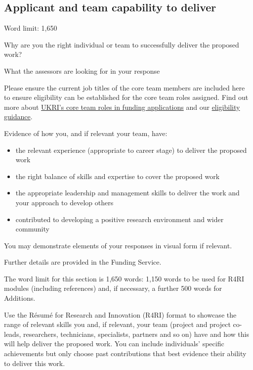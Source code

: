\documentclass[11pt]{article}
\newenvironment{instruction}{%
    \begin{tcolorbox}[breakable,colback=red!5,colframe=red,title=Instruction]%
	}{%
    	\end{tcolorbox}%
	}
\begin{document}
\pagebreak
\subsection{Applicant and team capability to deliver}

\begin{instruction}
Word limit: 1,650

Why are you the right individual or team to successfully deliver the proposed
work?

What the assessors are looking for in your response

Please ensure the current job titles of the core team members are included
here to ensure eligibility can be established for the core team roles assigned.
Find out more about
\href{https://www.ukri.org/publications/roles-in-funding-applications/roles-in-funding-applications-eligibility-responsibilities-and-costings-guidance/}{UKRI’s
core team roles in funding applications} and our
\href{https://www.ukri.org/councils/bbsrc/guidance-for-applicants/check-if-youre-eligible-for-funding/applicants-and-co-applicants/}{eligibility
guidance}.

Evidence of how you, and if relevant your team, have:

\begin{itemize}

    \item the relevant experience (appropriate to career stage) to deliver the proposed
work

    \item the right balance of skills and expertise to cover the proposed work

    \item the appropriate leadership and management skills to deliver the work and
your approach to develop others

    \item contributed to developing a positive research environment and wider
community

\end{itemize}

You may demonstrate elements of your responses in visual form if relevant.

Further details are provided in the Funding Service.

The word limit for this section is 1,650 words: 1,150 words to be used for R4RI
modules (including references) and, if necessary, a further 500 words for
Additions.

Use the Résumé for Research and Innovation (R4RI) format to showcase the range
of relevant skills you and, if relevant, your team (project and project
co-leads, researchers, technicians, specialists, partners and so on) have and
how this will help deliver the proposed work. You can include individuals’
specific achievements but only choose past contributions that best evidence
their ability to deliver this work.


\end{instruction}
\end{document}
